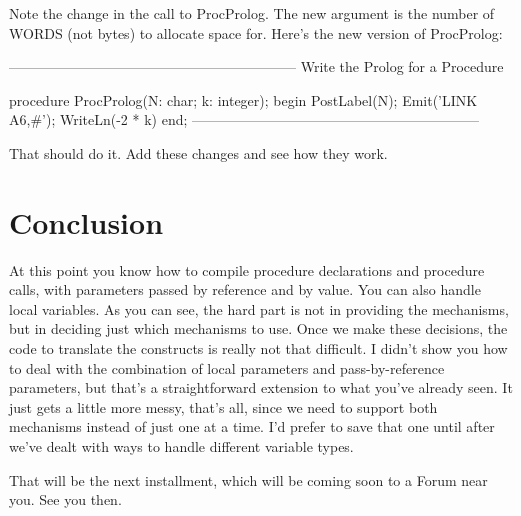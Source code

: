 \documentclass[float=false, crop=false]{standalone}
\begin{document}
Note the change in the call to ProcProlog. The new argument is the number of
WORDS (not bytes) to allocate space for. Here's the new version of ProcProlog:

\begin{code}
{--------------------------------------------------------------}
{ Write the Prolog for a Procedure }

procedure ProcProlog(N: char; k: integer);
begin
     PostLabel(N);
     Emit('LINK A6,#');
     WriteLn(-2 * k)
end;
{--------------------------------------------------------------}
\end{code}

That should do it.  Add these changes and see how they work.


\section{Conclusion}

At this point you know how to compile procedure declarations and procedure
calls, with parameters passed by reference and by value. You can also handle
local variables. As you can see, the hard part is not in providing the
mechanisms, but in deciding just which mechanisms to use. Once we make these
decisions, the code to translate the constructs is really not that difficult. I
didn't show you how to deal with the combination of local parameters and
pass-by-reference parameters, but that's a straightforward extension to what
you've already seen. It just gets a little more messy, that's all, since we need
to support both mechanisms instead of just one at a time. I'd prefer to save
that one until after we've dealt with ways to handle different variable types.

That will be the next installment, which will be coming soon to a Forum near
you. See you then.
\end{document}
